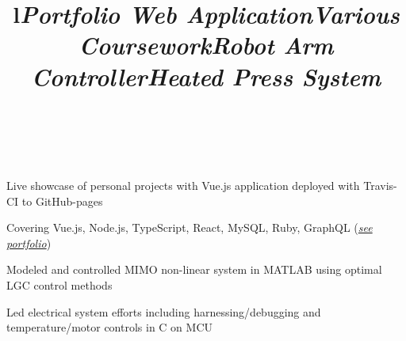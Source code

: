 \documentclass[mm]{res}
\begin{document}
\begin{resume}

\toprule

\section{\headingprojects}
\begin{format}
\title{l}\\
\body\\
\end{format}


\title{\textsl{Portfolio Web Application}}
\begin{position}
\tb Live showcase of personal projects with Vue.js application deployed with Travis-CI to GitHub-pages
\end{position}

\title{\textsl{Various Coursework}}
\begin{position}
\tb Covering Vue.js, Node.js, TypeScript, React, MySQL, Ruby, GraphQL (\textsl{\href{\myport}{see portfolio}})
\end{position}


\title{\textsl{Robot Arm Controller}}
\begin{position}
\tb Modeled and controlled MIMO non-linear system in MATLAB using optimal LGC control methods
\end{position}

\title{\textsl{Heated Press System}}
\begin{position}
\tb Led electrical system efforts including harnessing/debugging and temperature/motor controls in C on MCU
\end{position}



\end{resume}
\end{document}
